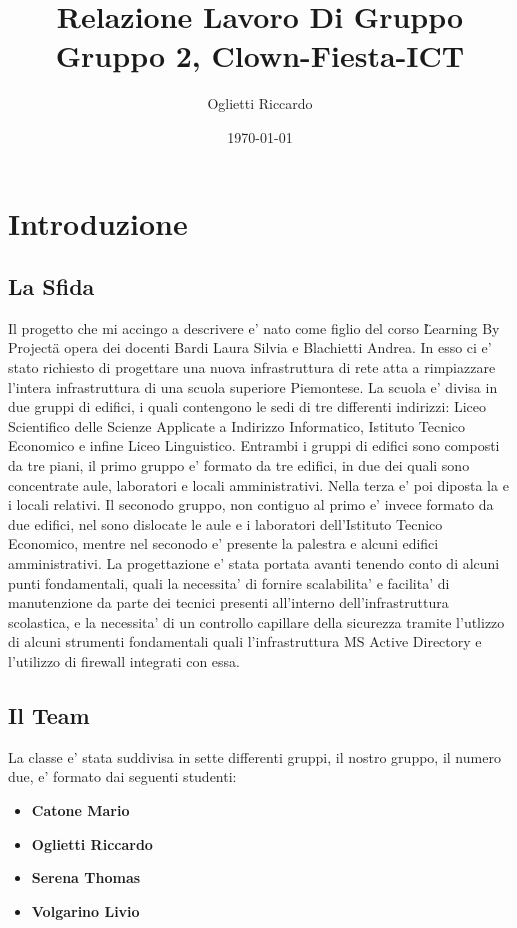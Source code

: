 \documentclass{report}
\author{Oglietti Riccardo}
\title{Relazione Lavoro Di Gruppo\\
\large Gruppo 2, Clown-Fiesta-ICT}
\date{\today}
\begin{document}
    \maketitle
    \chapter{Introduzione}
        \section{La Sfida}
            Il progetto che mi accingo a descrivere e' nato come figlio del corso \"Learning By Project\" a opera dei docenti \nolinebreak
             Bardi Laura Silvia e Blachietti Andrea. In esso ci e' stato richiesto di progettare una nuova infrastruttura di \nolinebreak
             rete atta a rimpiazzare l'intera infrastruttura di una scuola superiore Piemontese. La scuola e' divisa in due \nolinebreak
             gruppi di edifici, i quali contengono le sedi di tre differenti indirizzi: Liceo Scientifico delle Scienze \nolinebreak
             Applicate a Indirizzo Informatico, Istituto Tecnico Economico e infine Liceo Linguistico.
            Entrambi i gruppi di edifici sono composti da tre piani, il primo gruppo e' formato da tre edifici, in due \nolinebreak
             dei quali sono concentrate aule, laboratori e locali amministrativi. Nella terza e' poi diposta la \nolinebreak
             e i locali relativi.
            Il seconodo gruppo, non contiguo al primo e' invece formato da due edifici, nel sono dislocate le aule e \nolinebreak
             i laboratori dell'Istituto Tecnico Economico, mentre nel seconodo e' presente la palestra e alcuni edifici\nolinebreak
             amministrativi.
            La progettazione e' stata portata avanti tenendo conto di alcuni punti fondamentali, quali la necessita' di \nolinebreak
             fornire scalabilita' e facilita' di manutenzione da parte dei tecnici presenti all'interno dell'infrastruttura \nolinebreak
             scolastica, e la necessita' di un controllo capillare della sicurezza tramite l'utlizzo di alcuni strumenti \nolinebreak
             fondamentali quali l'infrastruttura MS Active Directory e l'utilizzo di firewall integrati con essa. \newpage
        \section{Il Team}
            La classe e' stata suddivisa in sette differenti gruppi, il nostro gruppo, il numero due, e' formato dai \nolinebreak
             seguenti studenti:
             \begin{itemize}
                 \item \textbf{Catone Mario}
                 \item \textbf{Oglietti Riccardo}
                 \item \textbf{Serena Thomas}
                 \item \textbf{Volgarino Livio}
             \end{itemize}
\end{document}
